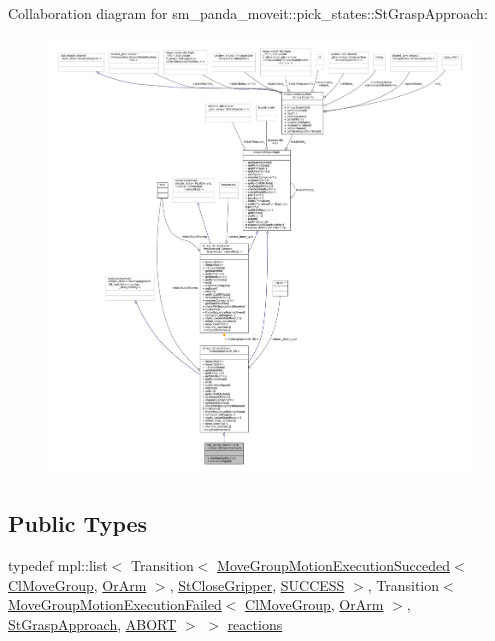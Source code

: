 Collaboration diagram for sm\+\_\+panda\+\_\+moveit\+:\+:pick\+\_\+states\+:\+:St\+Grasp\+Approach\+:
\nopagebreak
\begin{figure}[H]
\begin{center}
\leavevmode
\includegraphics[width=350pt]{structsm__panda__moveit_1_1pick__states_1_1StGraspApproach__coll__graph}
\end{center}
\end{figure}
\subsection*{Public Types}
\begin{DoxyCompactItemize}
\item 
typedef mpl\+::list$<$ Transition$<$ \hyperlink{structmoveit__z__client_1_1MoveGroupMotionExecutionSucceded}{Move\+Group\+Motion\+Execution\+Succeded}$<$ \hyperlink{classmoveit__z__client_1_1ClMoveGroup}{Cl\+Move\+Group}, \hyperlink{classsm__panda__moveit_1_1OrArm}{Or\+Arm} $>$, \hyperlink{structsm__panda__moveit_1_1pick__states_1_1StCloseGripper}{St\+Close\+Gripper}, \hyperlink{classSUCCESS}{S\+U\+C\+C\+E\+SS} $>$, Transition$<$ \hyperlink{structmoveit__z__client_1_1MoveGroupMotionExecutionFailed}{Move\+Group\+Motion\+Execution\+Failed}$<$ \hyperlink{classmoveit__z__client_1_1ClMoveGroup}{Cl\+Move\+Group}, \hyperlink{classsm__panda__moveit_1_1OrArm}{Or\+Arm} $>$, \hyperlink{structsm__panda__moveit_1_1pick__states_1_1StGraspApproach}{St\+Grasp\+Approach}, \hyperlink{classABORT}{A\+B\+O\+RT} $>$ $>$ \hyperlink{structsm__panda__moveit_1_1pick__states_1_1StGraspApproach_ae6bca0382acc2309654ca8a12e6f05f8}{reactions}
\end{DoxyCompactItemize}
